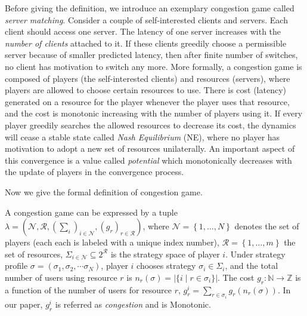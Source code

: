Before giving the definition, we introduce an exemplary congestion game called \textit{server matching}.
Consider a couple of self-interested clients and servers.
Each client should access one server.
The latency of one server increases with the \textit{number of clients} attached to it.
If these clients greedily choose a permissible server because of smaller predicted latency, then after finite number of switches, no client has motivation to switch any more.
%
More formally, a congestion game is composed of players (the self-interested clients) and resources (servers), where players are allowed to choose certain resources to use. There is cost (latency) generated on a resource for the player whenever the player uses that resource, and the cost is monotonic increasing with the number of players using it. 
If every player greedily searches the allowed resources to decrease its cost, the dynamics will cease a stable state called \emph{Nash Equilibrium} (NE), where no player has motivation to adopt a new set of resources unilaterally. 
An important aspect of this convergence is a value called \textit{potential} which monotonically decreases with the update of players in the convergence process.

Now we give the formal definition of congestion game.


A congestion game \cite{Rosenthal}\cite{Voecking06congestiongames} can be expressed by a tuple $\lambda=(\mathcal{N},\mathcal{R},(\sum_i)_{i \in \mathcal{N}},(g_r)_{r\in \mathcal{R}})$, where $\mathcal{N}=\left\{1,\ldots,N\right\}$ denotes the set of players (each each is labeled with a unique index number), $\mathcal{R}=\left\{1,\ldots,m\right\}$ the set of resources, $\Sigma_{i\in\mathcal{N}} \subseteq 2^{\mathcal{R}}$ is the strategy space of player $i$. 
Under strategy profile $\sigma=(\sigma_1,\sigma_2,\cdots \sigma_N)$, player $i$ chooses strategy $\sigma_i\in \Sigma_i$, and the total number of users using resource $r$ is $n_r(\sigma)=|\{i\mid r\in \sigma_i\}|$. 
The cost $g_r: \mathbb{N}\rightarrow \mathbb{Z}$ is a function of the number of users for resource $r$, $g_r^i=\sum_{r\in \sigma_i} g_r(n_r(\sigma))$. 
In our paper, $g_r^i$ is referred as \textit{congestion} and is Monotonic.

